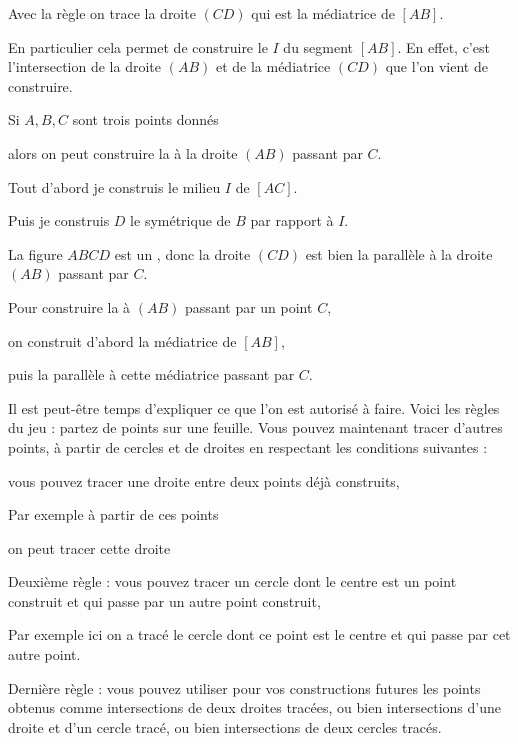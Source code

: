 \change
  Avec la règle on trace la droite $(CD)$ qui est la médiatrice de $[AB]$.
  
\change  
En particulier cela permet de construire le  
  $I$ du segment $[AB]$. En effet, c'est l'intersection 
de la droite $(AB)$ et de la médiatrice $(CD)$ 
que l'on vient de construire. 



\diapo

Si $A, B, C$ sont trois points donnés 

\change
alors  on peut construire la  à la droite $(AB)$ passant par $C$.

\change
  Tout d'abord je construis le milieu $I$ de $[AC]$. 
  
\change
  Puis je construis $D$ le symétrique de $B$ par rapport à $I$.
  
\change
  La figure $ABCD$ est un , 
  donc la droite $(CD)$ est bien la parallèle à la droite $(AB)$
  passant par $C$.
  
\change
Pour construire la  à $(AB)$ 
  passant par un point $C$, 
  
\change
on construit d'abord la médiatrice de $[AB]$, 

\change
puis la parallèle   à cette médiatrice passant par $C$. 

\diapo

Il est peut-être temps d'expliquer ce que l'on est autorisé à faire.
Voici les règles du jeu : partez de points sur une feuille.
Vous pouvez maintenant tracer d'autres points, à partir de cercles et de droites en respectant
les conditions suivantes :

\change
vous pouvez tracer une droite entre deux points déjà construits,


Par exemple à partir de ces points 

\change
on peut tracer cette droite

\change
Deuxième règle : vous pouvez tracer un cercle dont le centre est un point construit et qui passe
  par un autre point construit,
  
\change


Par exemple ici on a tracé le cercle dont ce point est le centre et qui passe par cet autre point.

\change
Dernière règle : 
vous pouvez utiliser pour vos constructions futures les points obtenus comme intersections de deux droites tracées,
ou bien intersections d'une droite et d'un cercle tracé,  ou bien intersections de deux cercles tracés.
  

